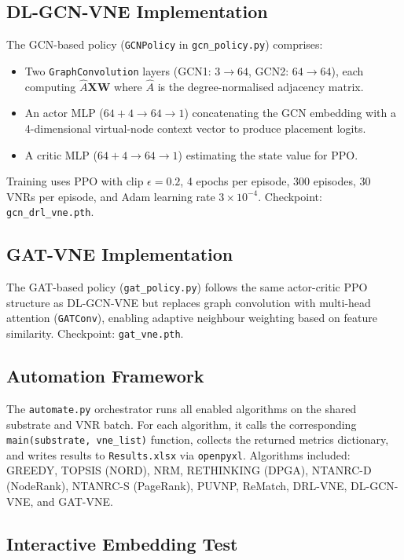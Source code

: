 \documentclass[12pt,a4paper]{report}
\begin{document}
\subsection{DL-GCN-VNE Implementation}

The GCN-based policy (\texttt{GCNPolicy} in \texttt{gcn\_policy.py}) comprises:
\begin{itemize}[leftmargin=*]
  \item Two \texttt{GraphConvolution} layers (GCN1: $3\to 64$, GCN2: $64\to 64$), each
        computing $\hat{A}\mathbf{X}\mathbf{W}$ where $\hat{A}$ is the degree-normalised
        adjacency matrix.
  \item An actor MLP ($64+4\to 64\to 1$) concatenating the GCN embedding with a 4-dimensional
        virtual-node context vector to produce placement logits.
  \item A critic MLP ($64+4\to 64\to 1$) estimating the state value for PPO.
\end{itemize}
Training uses PPO with clip $\epsilon=0.2$, 4 epochs per episode, 300 episodes, 30 VNRs per
episode, and Adam learning rate $3\times 10^{-4}$. Checkpoint: \texttt{gcn\_drl\_vne.pth}.

\subsection{GAT-VNE Implementation}

The GAT-based policy (\texttt{gat\_policy.py}) follows the same actor-critic PPO structure as
DL-GCN-VNE but replaces graph convolution with multi-head attention (\texttt{GATConv}),
enabling adaptive neighbour weighting based on feature similarity. Checkpoint:
\texttt{gat\_vne.pth}.

\subsection{Automation Framework}

The \texttt{automate.py} orchestrator runs all enabled algorithms on the shared substrate and
VNR batch. For each algorithm, it calls the corresponding \texttt{main(substrate, vne\_list)}
function, collects the returned metrics dictionary, and writes results to
\texttt{Results.xlsx} via \texttt{openpyxl}. Algorithms included: GREEDY, TOPSIS (NORD), NRM,
RETHINKING (DPGA), NTANRC-D (NodeRank), NTANRC-S (PageRank), PUVNP, ReMatch, DRL-VNE,
DL-GCN-VNE, and GAT-VNE.

\subsection{Interactive Embedding Test}
\end{document}
